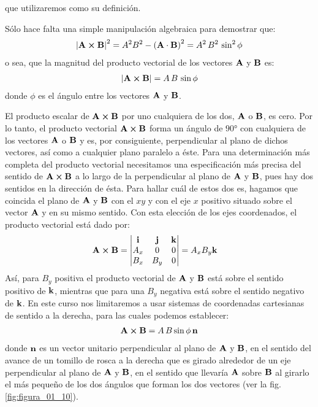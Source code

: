 que utilizaremos como su definición.
\par
Sólo hace falta una simple manipulación algebraica para demostrar que:
\begin{align*}
\abs{\vb{A} \cp \vb{B}}^{2} = A^{2} B^{2} - \left( \vb{A} \cdot \vb{B} \right)^{2} =  A^{2} \, B^{2} \, \sin^{2} \phi
\end{align*}
o sea, que la magnitud del producto vectorial de los vectores $\vb{A}$ y $\vb{B}$ es:
\begin{align}
    \abs{\vb{A} \cp \vb{B}} = A \, B \, \sin \phi
    \label{eq:ecuacion_01_23}
\end{align}
donde $\phi$ es el ángulo entre los vectores $\vb{A}$ y $\vb{B}$. 
\par
El producto escalar de $\vb{A} \cp \vb{B}$ por uno cualquiera de los dos, $\vb{A}$ o $\vb{B}$, es cero. Por lo tanto, el producto vectorial $\vb{A} \cp \vb{B}$ forma un ángulo de $\ang{90}$ con cualquiera de los vectores $\vb{A}$ o $\vb{B}$ y es, por consiguiente, 
perpendicular al plano de dichos vectores, así como a cualquier plano paralelo a éste. Para una determinación más completa del producto vectorial necesitamos una especificación más precisa del sentido de $\vb{A} \cp \vb{B}$ a lo largo de la perpendicular al plano de $\vb{A}$ y $\vb{B}$, pues hay dos sentidos en la dirección de ésta. Para hallar cuál de estos dos es, hagamos que coincida el plano de $\vb{A}$ y $\vb{B}$ con el $x y$ y con el eje $x$ positivo situado sobre el vector $\vb{A}$ y en su mismo sentido. Con esta elección de los ejes coordenados, el producto vectorial está dado por:
\begin{align*}
\vb{A} \cp \vb{B} &= \mdet{
    \vb{i} & \vb{j} & \vb{k} \\
    A_{x} & 0 & 0 \\
    B_{x} & B_{y} & 0 } = A_{x} B_{y} \vb{k}
\end{align*}
Así, para $B_{y}$ positiva el producto vectorial de $\vb{A}$ y $\vb{B}$ está sobre el sentido positivo de $\vb{k}$, mientras que para una $B_{y}$ negativa está sobre el sentido negativo de $\vb{k}$. En este curso nos limitaremos a usar sistemas de coordenadas cartesianas de sentido a la derecha, para las cuales podemos establecer:
\begin{align}
    \vb{A} \cp \vb{B} = A \,B \sin \phi \, \vb{n}
    \label{eq:ecuacion_01_24}
\end{align}
donde $\vb{n}$ es un vector unitario perpendicular al plano de $\vb{A}$ y $\vb{B}$, en el sentido del avance de un tomillo de rosca a la derecha que es girado alrededor de un eje perpendicular al plano de $\vb{A}$ y $\vb{B}$, en el sentido que llevaría $\vb{A}$ sobre $\vb{B}$ al girarlo el más pequeño de los dos ángulos que forman los dos vectores (ver la fig. \ref{fig:figura_01_10}).
